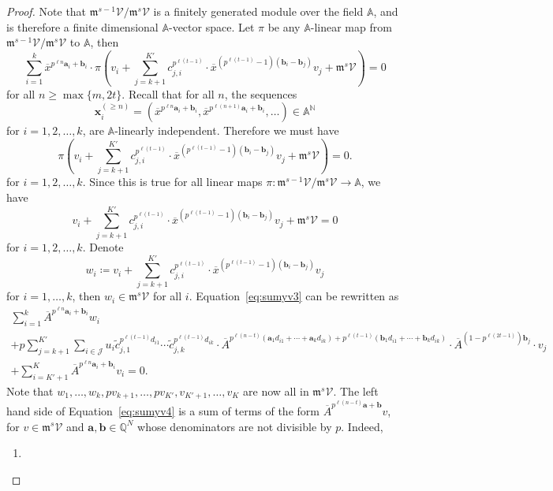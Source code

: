 \documentclass[10pt,a4paper]{amsart}
\newcommand{\A}{\mathbb{A}}
\newcommand{\N}{\mathbb{N}}
\newcommand{\Q}{\mathbb{Q}}
\newcommand{\ba}{\boldsymbol{a}}
\newcommand{\bb}{\boldsymbol{b}}
\newcommand{\bx}{\boldsymbol{x}}
\newcommand{\frm}{\mathfrak{m}}
\newcommand{\mJ}{\mathcal{J}}
\newcommand{\mV}{\mathcal{V}}
\newcommand{\oA}{\overline{A}}
\newcommand{\ox}{\overline{x}}
\newcommand{\tc}{\widetilde{c}}
\begin{document}
\begin{proof}
    Note that $\frm^{s-1} \mV/\frm^s\mV$ is a finitely generated module over the field $\A$, and is therefore a finite dimensional $\A$-vector space.
    Let $\pi$ be any $\A$-linear map from $\frm^{s-1} \mV/\frm^s\mV$ to $\A$, then
    \[
    \sum_{i = 1}^k \ox^{p^{\ell n} \ba_i + \bb_i} \cdot \pi \left(v_i + \sum_{j = k+1}^{K'} c_{j,i}^{p^{\ell (t-1)}} \cdot \ox^{(p^{\ell (t-1)} - 1) (\bb_i - \bb_j)} v_j + \frm^s\mV \right) = 0
    \]
    for all $n \geq \max\{m, 2t\}$.
    Recall that for all $n$, the sequences
    \[
    \bx_i^{(\geq n)} = \left(\ox^{p^{\ell n} \ba_i + \bb_i}, \ox^{p^{\ell (n+1)} \ba_i + \bb_i}, \ldots\right) \in \A^{\N}
    \]
    for $i = 1, 2, \ldots, k$, are $\A$-linearly independent.
    Therefore we must have
    \[
    \pi \left(v_i + \sum_{j = k+1}^{K'} c_{j,i}^{p^{\ell (t-1)}} \cdot \ox^{(p^{\ell (t-1)} - 1) (\bb_i - \bb_j)} v_j + \frm^s\mV \right) = 0.
    \]
    for $i = 1, 2, \ldots, k$. 
    Since this is true for all linear maps $\pi \colon \frm^{s-1} \mV/\frm^s\mV \rightarrow \A$, we have
    \[
    v_i + \sum_{j = k+1}^{K'} c_{j,i}^{p^{\ell (t-1)}} \cdot \ox^{(p^{\ell (t-1)} - 1) (\bb_i - \bb_j)} v_j + \frm^s\mV = 0
    \]
    for $i = 1, 2, \ldots, k$.
    Denote
    \[
    w_i \coloneqq v_i + \sum_{j = k+1}^{K'} c_{j,i}^{p^{\ell (t-1)}} \cdot \ox^{(p^{\ell (t-1)} - 1) (\bb_i - \bb_j)} v_j
    \]
    for $i = 1, \ldots, k$, then $w_i \in \frm^s\mV$ for all $i$.
    Equation~\eqref{eq:sumyv3} can be rewritten as
    \begin{multline}\label{eq:sumyv4}
    \sum_{i = 1}^k \oA^{p^{\ell n} \ba_i + \bb_i} w_i \\
        + p \sum_{j = k+1}^{K'} \sum_{i \in \mJ} u_{i} \tc_{j,1}^{p^{\ell (t-1)}d_{i1}} \cdots \tc_{j,k}^{p^{\ell (t-1)} d_{ik}} \cdot \oA^{p^{\ell (n-t)}(\ba_1 d_{i1} + \cdots + \ba_k d_{ik}) + p^{\ell (t-1)} (\bb_1 d_{i1} + \cdots + \bb_k d_{ik})} \cdot \oA^{(1 - p^{\ell (2t-1)}) \bb_j} \cdot v_j \\
        + \sum_{i = K'+1}^K \oA^{p^{\ell n} \ba_i + \bb_i} v_i = 0.
    \end{multline}
    Note that $w_1, \ldots, w_k, pv_{k+1}, \ldots, pv_{K'}, v_{K'+1}, \ldots, v_{K}$ are now all in $\frm^s \mV$.
    The left hand side of Equation~\eqref{eq:sumyv4} is a sum of terms of the form
    $
        \oA^{p^{\ell (n-t)} \ba + \bb} v
    $,
    for $v \in \frm^s \mV$ and $\ba, \bb \in \Q^{N}$ whose denominators are not divisible by $p$.
    Indeed,
    \begin{enumerate}[nosep, label=(\roman*)]
    \item 

\end{enumerate}
\end{proof}
\end{document}
